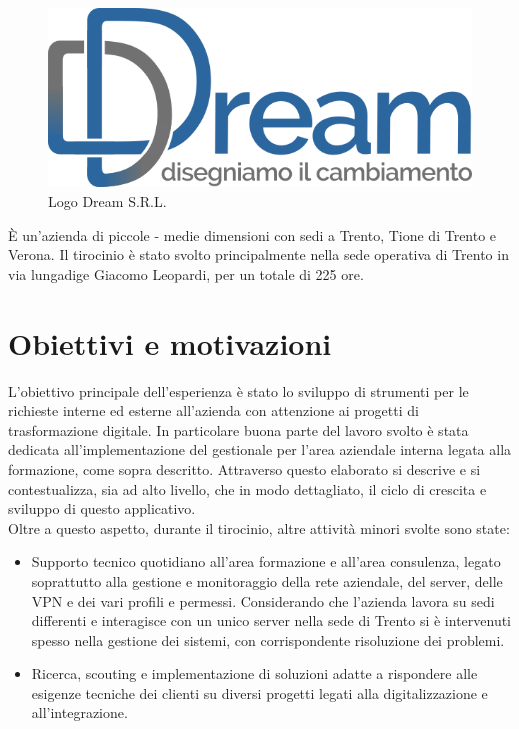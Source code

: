 \begin{figure}[h]
\centering
\includegraphics[scale=1.2]{img/DREAM_sito_logo_colori.png}
\caption{Logo Dream S.R.L.}
\label{fig:logodream}
\end{figure}
\noindent
È un'azienda di piccole - medie dimensioni con sedi a Trento, Tione di Trento e Verona.
Il tirocinio è stato svolto principalmente nella sede operativa di Trento in via lungadige Giacomo Leopardi, per un totale di 225 ore.


\section*{Obiettivi e motivazioni}
\label{sec:obiettivi}
L'obiettivo principale dell'esperienza è stato lo sviluppo di strumenti per le richieste interne ed esterne all’azienda con attenzione ai progetti di
trasformazione digitale. In particolare buona parte del lavoro svolto è stata dedicata all'implementazione del gestionale per l’area aziendale interna legata alla formazione, come sopra descritto. Attraverso questo elaborato si descrive e si contestualizza, sia ad alto livello, che in modo dettagliato, il ciclo di crescita e sviluppo di questo applicativo.\\
\newline
Oltre a questo aspetto, durante il tirocinio, altre attività minori svolte sono state:
\begin{itemize}
    \item Supporto tecnico quotidiano all’area formazione e all’area consulenza, legato soprattutto alla gestione e monitoraggio della rete aziendale, del server, delle VPN e dei vari profili e permessi. Considerando che l’azienda lavora su sedi differenti e interagisce con un unico server nella sede di Trento si è intervenuti spesso nella gestione dei sistemi, con corrispondente risoluzione dei problemi. 
    \item Ricerca, scouting e implementazione di soluzioni adatte a rispondere alle esigenze tecniche dei clienti su diversi progetti legati alla digitalizzazione e all'integrazione.
\end{itemize}

